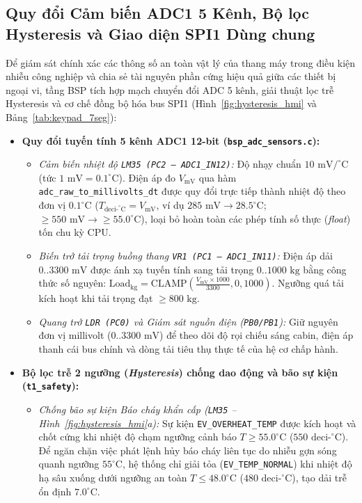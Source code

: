 \subsection{Quy đổi Cảm biến ADC1 5 Kênh, Bộ lọc Hysteresis và Giao diện SPI1 Dùng chung}
Để giám sát chính xác các thông số an toàn vật lý của thang máy trong điều kiện nhiễu công nghiệp và chia sẻ tài nguyên phần cứng hiệu quả giữa các thiết bị ngoại vi, tầng BSP tích hợp mạch chuyển đổi ADC 5 kênh, giải thuật lọc trễ Hysteresis và cơ chế đồng bộ hóa bus SPI1 (Hình~\ref{fig:hysteresis_hmi} và Bảng~\ref{tab:keypad_7seg}):
\begin{itemize}[nosep]
    \item \textbf{Quy đổi tuyến tính 5 kênh ADC1 12-bit (\texttt{bsp\_adc\_\allowbreak sensors.c}):}
    \begin{itemize}[nosep]
        \item \textit{Cảm biến nhiệt độ \texttt{LM35 (PC2 -- ADC1\_IN12)}:} Độ nhạy chuẩn $10\text{ mV}/^\circ\text{C}$ (tức $1\text{ mV} = 0.1^\circ\text{C}$). Điện áp đo $V_{\text{mV}}$ qua hàm \texttt{adc\_raw\_to\_millivolts\_dt} được quy đổi trực tiếp thành nhiệt độ theo đơn vị $0.1^\circ\text{C}$ ($T_{\text{deci-}^\circ\text{C}} = V_{\text{mV}}$, ví dụ $285\text{ mV} \rightarrow 28.5^\circ\text{C}$; $\ge 550\text{ mV} \rightarrow \ge 55.0^\circ\text{C}$), loại bỏ hoàn toàn các phép tính số thực (\textit{float}) tốn chu kỳ CPU.
        \item \textit{Biến trở tải trọng buồng thang \texttt{VR1 (PC1 -- ADC1\_IN11)}:} Điện áp dải $0..3300\text{ mV}$ được ánh xạ tuyến tính sang tải trọng $0..1000\text{ kg}$ bằng công thức số nguyên: $\text{Load}_{\text{kg}} = \text{CLAMP}\left(\frac{V_{\text{mV}} \times 1000}{3300}, 0, 1000\right)$. Ngưỡng quá tải kích hoạt khi tải trọng đạt $\ge 800\text{ kg}$.
        \item \textit{Quang trở \texttt{LDR (PC0)} và Giám sát nguồn điện (\texttt{PB0/PB1}):} Giữ nguyên đơn vị millivolt ($0..3300\text{ mV}$) để theo dõi độ rọi chiếu sáng cabin, điện áp thanh cái bus chính và dòng tải tiêu thụ thực tế của hệ cơ chấp hành.
    \end{itemize}
    \item \textbf{Bộ lọc trễ 2 ngưỡng (\textit{Hysteresis}) chống dao động và bão sự kiện (\texttt{t1\_safety}):}
    \begin{itemize}[nosep]
        \item \textit{Chống bão sự kiện Báo cháy khẩn cấp (\texttt{LM35} -- Hình~\ref{fig:hysteresis_hmi}a):} Sự kiện \texttt{EV\_OVERHEAT\_TEMP} được kích hoạt và chốt cứng khi nhiệt độ chạm ngưỡng cảnh báo $T \ge 55.0^\circ\text{C}$ ($550\text{ deci-}^\circ\text{C}$). Để ngăn chặn việc phát lệnh hủy báo cháy liên tục do nhiễu gợn sóng quanh ngưỡng $55^\circ\text{C}$, hệ thống chỉ giải tỏa (\texttt{EV\_TEMP\_NORMAL}) khi nhiệt độ hạ sâu xuống dưới ngưỡng an toàn $T \le 48.0^\circ\text{C}$ ($480\text{ deci-}^\circ\text{C}$), tạo dải trễ ổn định $7.0^\circ\text{C}$.

\end{itemize}
\end{itemize}
